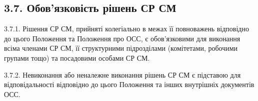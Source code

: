 \subsection*{3.7. Обов'язковість рішень СР СМ}
    3.7.1. Рішення СР СМ, прийняті колегіально в межах її повноважень відповідно до цього Положення та Положення про ОСС, є обов'язковими для виконання всіма членами СР СМ, її структурними підрозділами (комітетами, робочими групами тощо) та посадовими особами СР СМ.

    3.7.2. Невиконання або неналежне виконання рішень СР СМ є підставою для відповідальності відповідно до цього Положення та інших внутрішніх документів ОСС.
